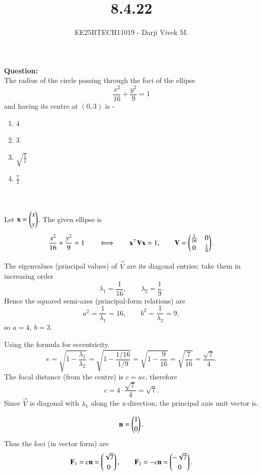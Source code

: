 \documentclass[journal]{IEEEtran}
\begin{document}


\title{8.4.22}
\author{EE25BTECH11019 - Darji Vivek M.}
{\let\newpage\relax\maketitle}

\renewcommand{\thefigure}{\theenumi}
\renewcommand{\thetable}{\theenumi}
\setlength{\intextsep}{10pt}
\renewcommand{\thetable}{\theenumi}

\textbf{Question:}\\[2pt]
The radius of the circle passing through the foci of the ellipse
\[
\frac{x^2}{16}+\frac{y^2}{9}=1
\]
and having its centre at $(0,3)$ is -\\[6pt]
\begin{multicols}{4}
\begin{enumerate}
    \item $4$
    \item $3$
    \item $\sqrt{\frac{1}{2}}$
    \item $\frac{7}{2}$
\end{enumerate}
\end{multicols}

\solution\\[-2mm]

\solution\\[4pt]
Let \(\mathbf x=\begin{pmatrix}x\\[2pt]y\end{pmatrix}\). The given ellipse is
\[
\frac{x^2}{16}+\frac{y^2}{9}=1
\qquad\Longleftrightarrow\qquad
\mathbf x^\top\mathbf V\mathbf x=1,\qquad
\mathbf V=\begin{pmatrix}\frac{1}{16} & 0\\[2pt]0 & \frac{1}{9}\end{pmatrix}.
\]

The eigenvalues (principal values) of \(\vec V\) are its diagonal entries; take them in increasing order
\[
\lambda_1=\frac{1}{16},\qquad \lambda_2=\frac{1}{9}.
\]
Hence the squared semi-axes (principal-form relations) are
\[
a^2=\frac{1}{\lambda_1}=16,\qquad b^2=\frac{1}{\lambda_2}=9,
\]
so \(a=4,\ b=3\).

Using the formula for eccentricity.
\[
e=\sqrt{1-\frac{\lambda_1}{\lambda_2}}
=\sqrt{1-\frac{1/16}{1/9}}
=\sqrt{1-\frac{9}{16}}
=\sqrt{\frac{7}{16}}
=\frac{\sqrt7}{4}.
\]
The focal distance (from the centre) is \(c = a e\), therefore
\[
c = 4\cdot\frac{\sqrt7}{4}=\sqrt7.
\]
Since \(\vec V\) is diagonal with \(\lambda_1\) along the x-direction, the principal axis unit vector is.

\[
\mathbf n=\begin{pmatrix}1\\[2pt]0\end{pmatrix}.
\]
Thus the foci (in vector form) are
\[
\mathbf F_1 = c\mathbf n = \begin{pmatrix}\sqrt7\\[2pt]0\end{pmatrix},\qquad
\mathbf F_2 = -c\mathbf n = \begin{pmatrix}-\sqrt7\\[2pt]0\end{pmatrix}.
\]
\end{document}
